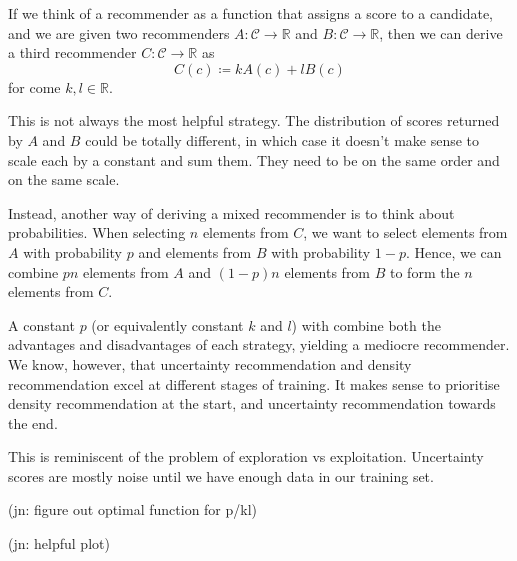 \documentclass[11pt,twoside]{report}
\newcommand\bbR{\mathbb{R}}
\newcommand\cC{\mathcal{C}}
\newcommand\jn[1]{{\color{red}(jn: #1)}}
\begin{document}
If we think of a recommender as a function that assigns a score to a candidate, and we are given two recommenders $A : \cC \to \bbR$ and $B : \cC \to \bbR$, then we can derive a third recommender $C : \cC \to \bbR$ as \[
    C(c) \coloneqq kA(c) + lB(c)
\] for come $k, l \in \bbR$.

This is not always the most helpful strategy. The distribution of scores returned by $A$ and $B$ could be totally different, in which case it doesn't make sense to scale each by a constant and sum them. They need to be on the same order and on the same scale.

Instead, another way of deriving a mixed recommender is to think about probabilities. When selecting $n$ elements from $C$, we want to select elements from $A$ with probability $p$ and elements from $B$ with probability $1-p$. Hence, we can combine $pn$ elements from $A$ and $(1-p)n$ elements from $B$ to form the $n$ elements from $C$.

A constant $p$ (or equivalently constant $k$ and $l$) with combine both the advantages and disadvantages of each strategy, yielding a mediocre recommender. We know, however, that uncertainty recommendation and density recommendation excel at different stages of training. It makes sense to prioritise density recommendation at the start, and uncertainty recommendation towards the end.

This is reminiscent of the problem of exploration vs exploitation. Uncertainty scores are mostly noise until we have enough data in our training set.

\jn{figure out optimal function for p/kl}

\jn{helpful plot}

{}

\end{document}
